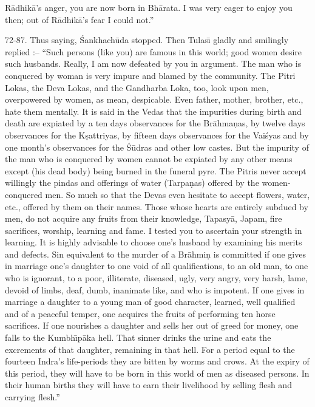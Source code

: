 R\=adhik\=a's anger, you are now born in Bh\=arata. I was very eager to enjoy you then; out of R\=adhik\=a's fear I could not.''

72-87. Thus saying, \'Sankhach\=uda stopped. Then Tulas\={\i} gladly and smilingly replied :-- ``Such persons (like you) are famous in this world; good women desire such husbands. Really, I am now defeated by you in argument. The man who is conquered by woman is very impure and blamed by the community. The Pitri Lokas, the Deva Lokas, and the Gandharba Loka, too, look upon men, overpowered by women, as mean, despicable. Even father, mother, brother, etc., hate them mentally. It is said in the Vedas that the impurities during birth and death are expiated by a ten days observances for the Br\=ahma\d{n}as, by twelve days observances for the K\d{s}attriyas, by fifteen days observances for the Vai\'syas and by one month's observances for the \'S\=udras and other low castes. But the impurity of the man who is conquered by women cannot be expiated by any other means except (his dead body) being burned in the funeral pyre. The Pitris never accept willingly the pindas and offerings of water (Tarpa\d{n}as) offered by the women-conquered men. So much so that the Devas even hesitate to accept flowers, water, etc., offered by them on their names. Those whose hearts are entirely subdued by men, do not acquire any fruits from their knowledge, Tapasy\=a, Japam, fire sacrifices, worship, learning and fame. I tested you to ascertain your strength in learning. It is highly advisable to choose one's husband by examining his merits and defects. Sin equivalent to the murder of a Br\=ahmi\d{n} is committed if one gives in marriage one's daughter to one void of all qualifications, to an old man, to one who is ignorant, to a poor, illiterate, diseased, ugly, very angry, very harsh, lame, devoid of limbs, deaf, dumb, inanimate like, and who is impotent. If one gives in marriage a daughter to a young man of good character, learned, well qualified and of a peaceful temper, one acquires the fruits of performing ten horse sacrifices. If one nourishes a daughter and sells her out of greed for money, one falls to the Kumbh\={\i}p\=aka hell. That sinner drinks the urine and eats the excrements of that daughter, remaining in that hell. For a period equal to the fourteen Indra's life-periods they are bitten by worms and crows. At the expiry of this period, they will have to be born in this world of men as diseased persons. In their human births they will have to earn their livelihood by selling flesh and carrying flesh.''

